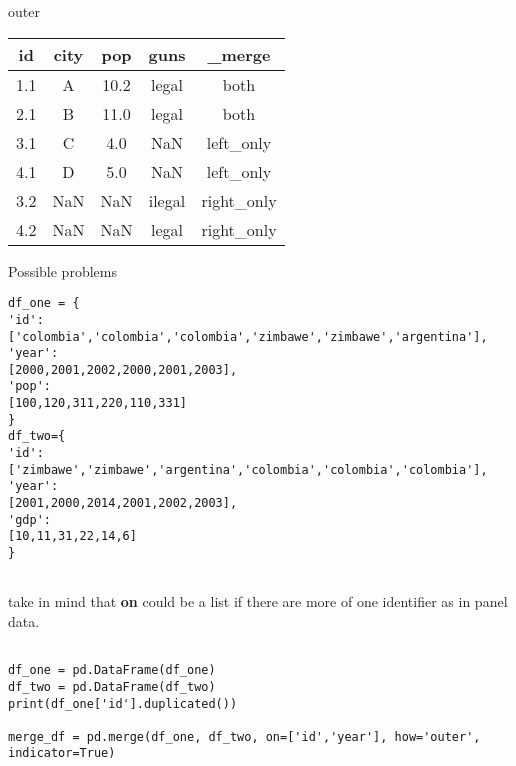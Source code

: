 \documentclass{beamer}
\begin{document}
\begin{frame}[fragile]{outer}
\begin{center}
\begin{table}[]
\begin{tabular}{ccccc}
\textbf{id} & \textbf{city} & \textbf{pop} & \textbf{guns} & \textbf{\_merge} \\ \hline
1.1         & A             & 10.2         & legal         & both             \\
2.1         & B             & 11.0         & legal         & both             \\
3.1         & C             & 4.0          & NaN           & left\_only       \\
4.1         & D             & 5.0          & NaN           & left\_only       \\
3.2         & NaN           & NaN          & ilegal        & right\_only      \\
4.2         & NaN           & NaN          & legal         & right\_only     
\end{tabular}
\end{table}
\end{center}

\end{frame}


\begin{frame}[fragile]{Possible problems}
\begin{lstlisting}
df_one = {
'id':
['colombia','colombia','colombia','zimbawe','zimbawe','argentina'], 
'year':
[2000,2001,2002,2000,2001,2003], 
'pop':
[100,120,311,220,110,331]
}
df_two={
'id':
['zimbawe','zimbawe','argentina','colombia','colombia','colombia'], 
'year':
[2001,2000,2014,2001,2002,2003],
'gdp':
[10,11,31,22,14,6]
}


\end{lstlisting}
\end{frame}

\begin{frame}[fragile]

take in mind that \textbf{on} could be a list if there are more of one identifier as in panel data.

\begin{lstlisting}

df_one = pd.DataFrame(df_one)
df_two = pd.DataFrame(df_two)
print(df_one['id'].duplicated())

merge_df = pd.merge(df_one, df_two, on=['id','year'], how='outer', indicator=True)

\end{lstlisting}
\end{frame}
\end{document}
